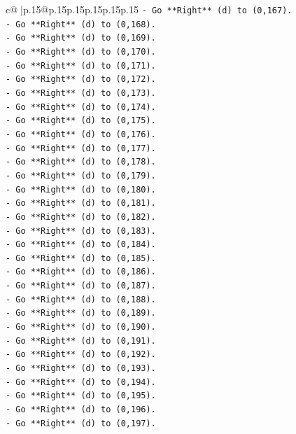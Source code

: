 \documentclass{article}
\begin{document}
{\begin{supertabular}{c@{$\;$}|p{.15\linewidth}@{}p{.15\linewidth}p{.15\linewidth}p{.15\linewidth}p{.15\linewidth}p{.15\linewidth}}
{{{\texttt{{-} Go **Right** (d) to (0,167).} \\
\texttt{{-} Go **Right** (d) to (0,168).} \\
\texttt{{-} Go **Right** (d) to (0,169).} \\
\texttt{{-} Go **Right** (d) to (0,170).} \\
\texttt{{-} Go **Right** (d) to (0,171).} \\
\texttt{{-} Go **Right** (d) to (0,172).} \\
\texttt{{-} Go **Right** (d) to (0,173).} \\
\texttt{{-} Go **Right** (d) to (0,174).} \\
\texttt{{-} Go **Right** (d) to (0,175).} \\
\texttt{{-} Go **Right** (d) to (0,176).} \\
\texttt{{-} Go **Right** (d) to (0,177).} \\
\texttt{{-} Go **Right** (d) to (0,178).} \\
\texttt{{-} Go **Right** (d) to (0,179).} \\
\texttt{{-} Go **Right** (d) to (0,180).} \\
\texttt{{-} Go **Right** (d) to (0,181).} \\
\texttt{{-} Go **Right** (d) to (0,182).} \\
\texttt{{-} Go **Right** (d) to (0,183).} \\
\texttt{{-} Go **Right** (d) to (0,184).} \\
\texttt{{-} Go **Right** (d) to (0,185).} \\
\texttt{{-} Go **Right** (d) to (0,186).} \\
\texttt{{-} Go **Right** (d) to (0,187).} \\
\texttt{{-} Go **Right** (d) to (0,188).} \\
\texttt{{-} Go **Right** (d) to (0,189).} \\
\texttt{{-} Go **Right** (d) to (0,190).} \\
\texttt{{-} Go **Right** (d) to (0,191).} \\
\texttt{{-} Go **Right** (d) to (0,192).} \\
\texttt{{-} Go **Right** (d) to (0,193).} \\
\texttt{{-} Go **Right** (d) to (0,194).} \\
\texttt{{-} Go **Right** (d) to (0,195).} \\
\texttt{{-} Go **Right** (d) to (0,196).} \\
\texttt{{-} Go **Right** (d) to (0,197).} \\
}}}
\end{supertabular}}
\end{document}
